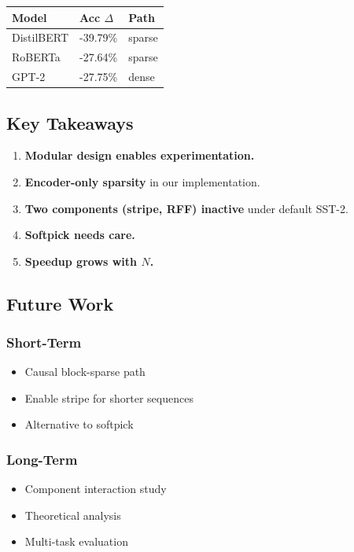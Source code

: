 \begin{table}[H]
\centering
\small
\begin{tabular}{lll}
\toprule
\textbf{Model} & \textbf{Acc $\Delta$} & \textbf{Path} \\
\midrule
DistilBERT & -39.79\% & sparse \\
RoBERTa & -27.64\% & sparse \\
GPT-2 & -27.75\% & dense \\
\bottomrule
\end{tabular}
\end{table}

\subsection{Key Takeaways}

\begin{enumerate}
\item \textbf{Modular design enables experimentation.}
\item \textbf{Encoder-only sparsity} in our implementation.
\item \textbf{Two components (stripe, RFF) inactive} under default SST-2.
\item \textbf{Softpick needs care.}
\item \textbf{Speedup grows with $N$.}

\end{enumerate}
\subsection{Future Work}

\subsubsection{Short-Term}
\begin{itemize}
\item Causal block-sparse path
\item Enable stripe for shorter sequences
\item Alternative to softpick

\end{itemize}
\subsubsection{Long-Term}
\begin{itemize}
\item Component interaction study
\item Theoretical analysis
\item Multi-task evaluation

\end{itemize}
